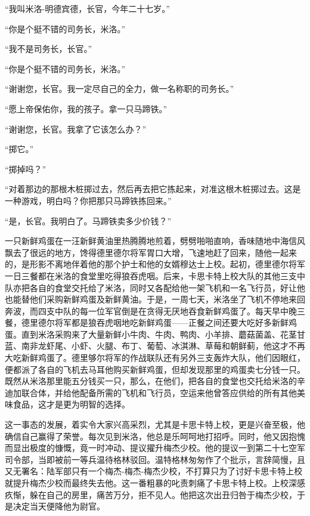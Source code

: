     “我叫米洛-明德宾德，长官，今年二十七岁。”

    “你是个挺不错的司务长，米洛。”

    “我不是司务长，长官。”

    “你是个挺不错的司务长，米洛。”

    “谢谢您，长官。我一定尽自己的全力，做一名称职的司务长。”

    “愿上帝保佑你，我的孩子。拿一只马蹄铁。”

    “谢谢您，长官。我拿了它该怎么办？”

    “掷它。”

    “掷掉吗？”

    “对着那边的那根木桩掷过去，然后再去把它拣起来，对准这根木桩掷过去。这是一种游戏，明白吗？你把那只马蹄铁拣回来。”

    “是，长官。我明白了。马蹄铁卖多少价钱？”

    一只新鲜鸡蛋在一汪新鲜黄油里热腾腾地煎着，劈劈啪啪直响，香味随地中海信风飘去了很远的地方，馋得德里德尔将军胃口大增，飞速地赶了回来，随他一起来的，是形影不离地伴着他的那个护士和他的女婿穆达士上校。起初，德里德尔将军一日三餐都在米洛的食堂里吃得狼吞虎咽。后来，卡思卡特上校大队的其他三支中队亦把各自的食堂交托给了米洛，同时又各配给他一架飞机和一名飞行员，好让他也能替他们采购新鲜鸡蛋及新鲜黄油。于是，一周七天，米洛坐了飞机不停地来回奔波，而四支中队的每一位军官倒是在贪得无厌地吞食新鲜鸡蛋了。每天早中晚三餐，德里德尔将军都是狼吞虎咽地吃新鲜鸡蛋——正餐之间还要大吃好多新鲜鸡蛋。直到米洛采购来了大量新鲜小牛肉、牛肉、鸭肉、小羊排、蘑菇菌盖、花茎甘蓝、南非龙虾尾、小虾、火腿、布丁、葡萄、冰淇淋、草莓和朝鲜蓟，他这才不再大吃新鲜鸡蛋了。德里够尔将军的作战联队还有另外三支轰炸大队，他们因眼红，便都派了各自的飞机去马耳他购买新鲜鸡蛋，但却发现那里的鸡蛋卖七分钱一只。既然从米洛那里能五分钱买一只，那么，在他们，把各自的食堂也交托给米洛的辛迪加联合体，并给他配备所需的飞机和飞行员，空运来他曾答应供给的所有其他美味食品，这才是更为明智的选择。

    这一事态的发展，着实令大家兴高采烈，尤其是卡思卡特上校，更是兴奋至极，他确信自己赢得了荣誉。每次见到米洛，他总是乐呵呵地打招呼。同时，他又因抱愧而显出极度的慷慨，竟一时冲动、提议擢升梅杰少校。他的提议一到第二十七空军司令部，当即被前一等兵温待格林驳回。温特格林匆匆作了个批示，言辞简慢，且又无署名：陆军部只有一个梅杰-梅杰-梅杰少校，不打算只为了讨好卡思卡特上校就提升梅杰少校而最终失去他。这一番粗暴的叱责刺痛了卡思卡特上校。上校深感疚惭，躲在自己的房里，痛苦万分，拒不见人。他把这次出丑归咎于梅杰少校，于是决定当天便降他为尉官。
 


